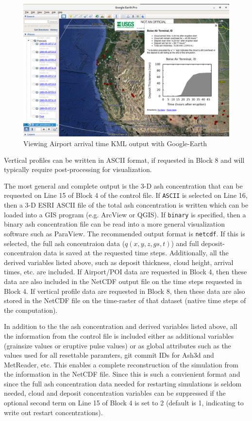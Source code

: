 \begin{figure}[htbp]
\includegraphics[angle=0,scale=0.35]{Figures/Ash3dOutput_KMLPOIarrival_GoogleEarth.png}
\parbox{15cm}{\caption{\label{FigAsh3dOutputKMLPOIarrivalTS}
Viewing Airport arrival time KML output with Google-Earth}}
\end{figure}

Vertical profiles can be written in ASCII format, if requested in Block 8 and will typically
require post-processing for visualization.

The most general and complete output is the 3-D ash concentration that can be requested on
Line 15 of Block 4 of the control file. If \texttt{ASCII} is selected on Line 16, then
a 3-D ESRI ASCII file of the total ash concentration is written which can be loaded into
a GIS program (e.g. ArcView or QGIS). If \texttt{binary} is specified, then a binary
ash concentration file can be read into a more general visualization software such
as ParaView. The recommended output format is \texttt{netcdf}. If this is selected,
the full ash concentraion data ($q(x,y,z,gs,t)$) and full deposit-concentraion data is saved at
the requested time steps. Additionally, all the derived variables listed above, such
as deposit thickness, cloud height, arrival times, etc. are included. If Airport/POI
data are requested in Block 4, then these data are also included in the NetCDF output
file on the time steps requested in Block 4.  If vertical profile data are requested in
Block 8, then these data are also stored in the NetCDF file on the time-raster of that
dataset (native time steps of the computation).

In addition to the the ash concentration and derived variables listed above, all the
information from the control file is included either as additional variables (grainsize
values or eruptive pulse values) or as global attributes such as the values used for
all resettable paramters, git commit IDs for Ash3d and MetReader, etc.  This enables
a complete reconstruction of the simulation from the information in the NetCDF file.
Since this is such a convienient format and since the full ash concentration data needed
for restarting simulations is seldom needed, cloud and deposit concentration variables
can be suppressed if the optional second term on Line 15 of Block 4 is set to 2 (default
is 1, indicating to write out restart concentrations).

